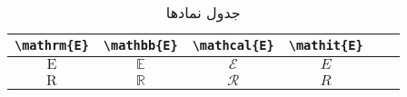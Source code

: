 \documentclass{report}
\begin{document}
\begin{table}
\centering
\caption{جدول نمادها}
\label{table:asase3}
\begin{latin}
\begin{tabular}{|c|c|c|c|c|c}\hline
\verb|\mathrm{E}| & \verb|\mathbb{E}|& \verb|\mathcal{E}|& \verb|\mathit{E}|\\\hline
$\mathrm{E}$ & $\mathbb{E}$ & $\mathcal{E}$ & $\mathit{E}$\\\hline
$\mathrm{R}$ & $\mathbb{R}$ & $\mathcal{R}$ & $\mathit{R}$\\\hline
\end{tabular}
\end{latin}
\end{table}


\printglossary
\printabbreviation
\end{document}
